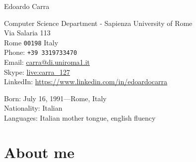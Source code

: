 \documentclass[11pt, a4paper]{article} %
\begin{document}


{\LARGE Edoardo Carra}\\[1cm] %

\vfill %

\vfill %

Computer Science Department - Sapienza University of Rome\\ %
Via Salaria 113\\
Rome \texttt{00198}
Italy\\[.2cm]
Phone: \texttt{+39 3319733470}\\ %
Email: \href{mailto:carra@di.uniroma1.it}{carra@di.uniroma1.it}\\ %
Skype: \href{https://join.skype.com/invite/gQN9qtZGLZ7r}{live:carra\_127}\\
LinkedIn: \href{https://www.linkedin.com/in/edoardocarra/}{https://www.linkedin.com/in/edoardocarra}\\ %

\vfill %


Born: July 16, 1991---Rome, Italy\\ %
Nationality: Italian\\ %
Languages: Italian mother tongue, english fluency\\

\section*{About me}
\end{document}
